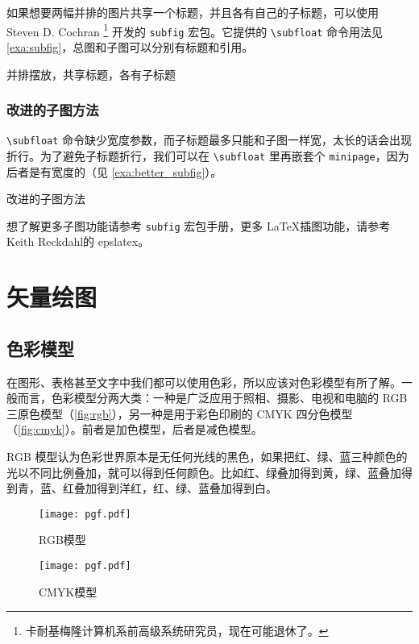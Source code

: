 如果想要两幅并排的图片共享一个标题，并且各有自己的子标题，可以使用 Steven D. Cochran\indexCochran{} \footnote{卡耐基梅隆计算机系前高级系统研究员，现在可能退休了。} 开发的 \texttt{subfig} 宏包。它提供的 \verb|\subfloat| 命令用法见 \autoref{exa:subfig}，总图和子图可以分别有标题和引用。

\begin{example}[htbp]
\caption{并排摆放，共享标题，各有子标题}
\label{exa:subfig}
\end{example}

\subsubsection{改进的子图方法}

\verb|\subfloat| 命令缺少宽度参数，而子标题最多只能和子图一样宽，太长的话会出现折行。为了避免子标题折行，我们可以在 \verb|\subfloat| 里再嵌套个 \texttt{minipage}，因为后者是有宽度的（见 \autoref{exa:better_subfig}）。

\begin{example}[htbp]
\caption{改进的子图方法}
\label{exa:better_subfig}
\end{example}

想了解更多子图功能请参考 \texttt{subfig} 宏包手册\citep{Cochran_subfig}，更多 \LaTeX 插图功能，请参考 Keith Reckdahl\indexReckdahl 的 epslatex\citep{Reckdahl_epslatex}。

\section{矢量绘图}
\label{sec:draft}

\subsection{色彩模型}

在图形、表格甚至文字中我们都可以使用色彩，所以应该对色彩模型有所了解。一般而言，色彩模型分两大类：一种是广泛应用于照相、摄影、电视和电脑的 RGB 三原色模型（\autoref{fig:rgb}），另一种是用于彩色印刷的 CMYK 四分色模型（\autoref{fig:cmyk}）。前者是加色模型，后者是减色模型。

RGB 模型认为色彩世界原本是无任何光线的黑色，如果把红、绿、蓝三种颜色的光以不同比例叠加，就可以得到任何颜色。比如红、绿叠加得到黄，绿、蓝叠加得到青，蓝、红叠加得到洋红，红、绿、蓝叠加得到白。

\begin{figure}[htbp]
\centering
\begin{minipage}{140pt}
\texttt{[image: pgf.pdf]}
\caption{RGB模型}
\label{fig:rgb}
\end{minipage}
\hspace{10pt}%
\begin{minipage}{140pt}
\texttt{[image: pgf.pdf]}
\caption{CMYK模型}
\label{fig:cmyk}
\end{minipage}
\end{figure}

